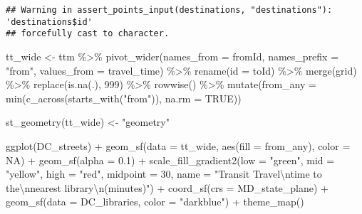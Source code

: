 \documentclass[
]{article}
\newenvironment{Shaded}{\begin{snugshade}}{\end{snugshade}}
\newcommand{\AttributeTok}[1]{\textcolor[rgb]{0.77,0.63,0.00}{#1}}
\newcommand{\ConstantTok}[1]{\textcolor[rgb]{0.00,0.00,0.00}{#1}}
\newcommand{\DecValTok}[1]{\textcolor[rgb]{0.00,0.00,0.81}{#1}}
\newcommand{\FloatTok}[1]{\textcolor[rgb]{0.00,0.00,0.81}{#1}}
\newcommand{\FunctionTok}[1]{\textcolor[rgb]{0.00,0.00,0.00}{#1}}
\newcommand{\NormalTok}[1]{#1}
\newcommand{\OtherTok}[1]{\textcolor[rgb]{0.56,0.35,0.01}{#1}}
\newcommand{\SpecialCharTok}[1]{\textcolor[rgb]{0.00,0.00,0.00}{#1}}
\newcommand{\StringTok}[1]{\textcolor[rgb]{0.31,0.60,0.02}{#1}}
\begin{document}
\begin{verbatim}
## Warning in assert_points_input(destinations, "destinations"): 'destinations$id'
## forcefully cast to character.
\end{verbatim}

\begin{Shaded}
\begin{Highlighting}[]
\NormalTok{tt\_wide }\OtherTok{\textless{}{-}}\NormalTok{ ttm }\SpecialCharTok{\%\textgreater{}\%}
  \FunctionTok{pivot\_wider}\NormalTok{(}\AttributeTok{names\_from =}\NormalTok{ fromId, }
              \AttributeTok{names\_prefix =} \StringTok{"from"}\NormalTok{, }\AttributeTok{values\_from =}\NormalTok{ travel\_time) }\SpecialCharTok{\%\textgreater{}\%}
  \FunctionTok{rename}\NormalTok{(}\AttributeTok{id =}\NormalTok{ toId) }\SpecialCharTok{\%\textgreater{}\%} 
  \FunctionTok{merge}\NormalTok{(grid) }\SpecialCharTok{\%\textgreater{}\%}
  \FunctionTok{replace}\NormalTok{(}\FunctionTok{is.na}\NormalTok{(.), }\DecValTok{999}\NormalTok{) }\SpecialCharTok{\%\textgreater{}\%}
  \FunctionTok{rowwise}\NormalTok{() }\SpecialCharTok{\%\textgreater{}\%}
  \FunctionTok{mutate}\NormalTok{(}\AttributeTok{from\_any =} \FunctionTok{min}\NormalTok{(}\FunctionTok{c\_across}\NormalTok{(}\FunctionTok{starts\_with}\NormalTok{(}\StringTok{"from"}\NormalTok{)), }\AttributeTok{na.rm =} \ConstantTok{TRUE}\NormalTok{))}

\FunctionTok{st\_geometry}\NormalTok{(tt\_wide) }\OtherTok{\textless{}{-}} \StringTok{"geometry"}
\end{Highlighting}
\end{Shaded}

\begin{Shaded}
\begin{Highlighting}[]
\FunctionTok{ggplot}\NormalTok{(DC\_streets) }\SpecialCharTok{+}
  \FunctionTok{geom\_sf}\NormalTok{(}\AttributeTok{data =}\NormalTok{ tt\_wide, }
          \FunctionTok{aes}\NormalTok{(}\AttributeTok{fill =}\NormalTok{ from\_any), }
          \AttributeTok{color =} \ConstantTok{NA}\NormalTok{) }\SpecialCharTok{+}
  \FunctionTok{geom\_sf}\NormalTok{(}\AttributeTok{alpha =} \FloatTok{0.1}\NormalTok{) }\SpecialCharTok{+}
  \FunctionTok{scale\_fill\_gradient2}\NormalTok{(}\AttributeTok{low =} \StringTok{"green"}\NormalTok{, }\AttributeTok{mid =} \StringTok{"yellow"}\NormalTok{, }\AttributeTok{high =} \StringTok{"red"}\NormalTok{, }
                       \AttributeTok{midpoint =} \DecValTok{30}\NormalTok{,}
        \AttributeTok{name =} \StringTok{"Transit Travel}\SpecialCharTok{\textbackslash{}n}\StringTok{time to the}\SpecialCharTok{\textbackslash{}n}\StringTok{nearest library}\SpecialCharTok{\textbackslash{}n}\StringTok{(minutes)"}\NormalTok{) }\SpecialCharTok{+}
  \FunctionTok{coord\_sf}\NormalTok{(}\AttributeTok{crs =}\NormalTok{ MD\_state\_plane) }\SpecialCharTok{+}
 \FunctionTok{geom\_sf}\NormalTok{(}\AttributeTok{data =}\NormalTok{ DC\_libraries, }\AttributeTok{color =} \StringTok{"darkblue"}\NormalTok{) }\SpecialCharTok{+}
   \FunctionTok{theme\_map}\NormalTok{()}
\end{Highlighting}
\end{Shaded}
\end{document}
